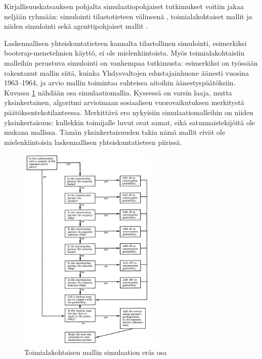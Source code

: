 \documentclass[finnish,gradu,twoside,12pt]{tktltiki}
\begin{document}

Kirjallisuuskatsauksen pohjalta simulaatiopohjaiset tutkimukset voitiin jakaa neljään ryhmään: simulointi tilastotieteen välineenä \citep[esimerkiksi][]{clinton2004statistical,imai2012statistical,mooney1996bootstrap,slantchev2004initiators}, toimialakohtaiset mallit ja niiden simulointi \citep[esimerkiksi][]{Shapiro1968} sekä agenttipohjaiset mallit \citep[esimerkiksi][]{orbell2004machiavellian,altaweel2012mobilizing,anderson2011highlights,bloomquist2006comparison}. %

Laskennallisen yhteiskuntatieteen kannalta tilastollinen simulointi, esimerkiksi bootsrap-menetelmien käyttö, ei ole mielenkiintoista. Myös toimialakohtaisiin malleihin perustuva simulointi on vanhempaa tutkimusta: esimerkiksi \citet{Shapiro1968} on työssään rakentanut mallin siitä, kuinka Yhdysvaltojen edustajainhuone äänesti vuosina 1963--1964, ja arvio mallin toimintaa suhteissa aitoihin äänestyspäätöksiin. Kuvassa \ref{fig:domain_sim} nähdään osa simulaatiomallia. Kyseessä on varsin laaja, mutta yksinkertainen, algoritmi arvioimaan sosiaalisen vuorovaikutuksen merkitystä päätöksentekotilanteessa. Merkittävä ero nykyisiin simulaatiomalleihin on niiden yksinkertaisuus: kullekkin toimijalle luvut ovat samat, eikä satunnaistekijöitä ole mukana mallissa. Tämän yksinkertaisuuden takia nämä mallit eivät ole mielenkiintoisia laskennallisen yhteiskuntatieteen piirissä.

\begin{figure}
\includegraphics[height=10cm]{images/domain_spesific_model.png} 
\caption{Toimialakohtaisen mallin simulaation eräs osa \citep{Shapiro1968}}
\label{fig:domain_sim}
\end{figure}
\end{document}

